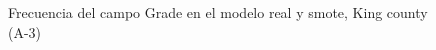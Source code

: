 \begin{figure}[H]
    \centering
    
    \caption{Frecuencia del campo Grade en el modelo real y smote, King county (A-3)}
    \label{frecuency-smote-grade}
\end{figure}